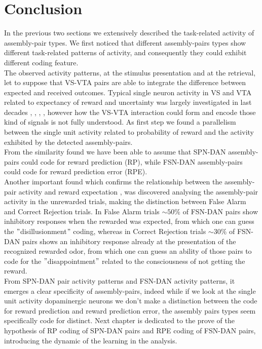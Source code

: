 \section{Conclusion}
In the previous two sections we extensively described the task-related activity of assembly-pair types. We first noticed that different assembly-pairs types show different task-related patterns of activity, and consequently they could exhibit different coding feature.\\The observed activity patterns, at the stimulus presentation and at the retrieval, let to suppose that VS-VTA pairs are able to integrate the difference between expected and received outcomes. Typical single neuron activity in VS and VTA related to expectancy of reward and uncertainty was largely investigated in last decades \cite{Fiorillo}, \cite{Schultz}, \cite{Schultz1992}, \cite{Schultz1998}, however how the VS-VTA interaction could form and encode those kind of signals is not fully understood. As first step we found a parallelism between the single unit activity related to probability of reward and the activity exhibited by the detected assembly-pairs.\\From the similarity found we have been able to assume that SPN-DAN assembly-pairs could code for reward prediction (RP), while FSN-DAN assembly-pairs could code for reward prediction error (RPE).\\Another important found which confirms the relationship between the assembly-pair activity and reward expectation \cite{Doya} , was discovered analysing the assembly-pair activity in the unrewarded trials, making the distinction between False Alarm and Correct Rejection trials. In False Alarm trials $\sim 50\%$ of FSN-DAN pairs show inhibitory responses when the rewarded was expected, from which one can guess the $"$disillusionment$"$ coding, whereas in Correct Rejection trials $\sim 30\%$ of FSN-DAN pairs shows an inhibitory response already at the presentation of the recognized rewarded odor, from which one can guess an ability of those pairs to code for the $"$disappointment$"$ related to the consciousness of not getting the reward.\\From SPN-DAN pair activity patterns and FSN-DAN activity patterns, it emerges a clear specificity of assembly-pairs, indeed while if we look at the single unit activity dopaminergic neurons we don't make a distinction between the code for reward prediction and reward prediction error, the assembly pairs types seem specifically code for distinct. Next chapter is dedicated to the prove of the hypothesis of RP coding of SPN-DAN pairs and RPE coding of FSN-DAN pairs, introducing the dynamic of the learning in the analysis.

